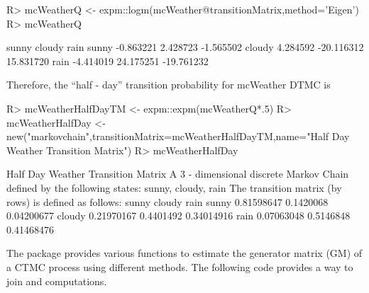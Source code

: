 \documentclass[article,nojss]{jss}
\begin{document}
\begin{CodeChunk}

\begin{CodeInput}
R> mcWeatherQ <- expm::logm(mcWeather@transitionMatrix,method='Eigen')
R> mcWeatherQ
\end{CodeInput}

\begin{CodeOutput}
           sunny     cloudy       rain
sunny  -0.863221   2.428723  -1.565502
cloudy  4.284592 -20.116312  15.831720
rain   -4.414019  24.175251 -19.761232
\end{CodeOutput}
\end{CodeChunk}

Therefore, the ``half - day'' transition probability for mcWeather DTMC is

\begin{CodeChunk}

\begin{CodeInput}
R> mcWeatherHalfDayTM <- expm::expm(mcWeatherQ*.5)
R> mcWeatherHalfDay <- new("markovchain",transitionMatrix=mcWeatherHalfDayTM,name="Half Day Weather Transition Matrix")
R> mcWeatherHalfDay
\end{CodeInput}

\begin{CodeOutput}
Half Day Weather Transition Matrix 
 A  3 - dimensional discrete Markov Chain defined by the following states: 
 sunny, cloudy, rain 
 The transition matrix  (by rows)  is defined as follows: 
            sunny    cloudy       rain
sunny  0.81598647 0.1420068 0.04200677
cloudy 0.21970167 0.4401492 0.34014916
rain   0.07063048 0.5146848 0.41468476
\end{CodeOutput}
\end{CodeChunk}

The  package \citep{pkg:ctmcd} provides various functions to estimate the generator matrix (GM) of a CTMC process using different methods. The following code provides a way to join  and  computations.
\end{document}
